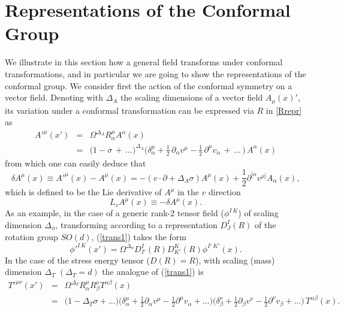 \documentclass[a4paper,11pt,openright,twoside]{book}
\let\a=\alpha   \let\b=\beta   \let\g=\gamma   \let\d=\delta
\numberwithin{equation}{section}
\begin{document}
\section{Representations of the Conformal Group}
We illustrate in this section how a general field transforms under conformal transformations, and in particular we are going to show the representations of the conformal group. 
We consider first the action of the conformal symmetry on a vector field.
Denoting with $\Delta_A$ the scaling dimensions of a vector field $A_\mu(x)'$,  its variation under a conformal transformation can be expressed via $R$ in \eqref{Rrepr} as
\begin{eqnarray}
	\label{trans1}
	A'^\mu(x')&=&\Omega^{\Delta_A} R^{\mu}_{\alpha} A^\alpha(x)\nonumber \\
	&=&\big(1-\sigma\,+\,\dots\big)^{\Delta_A}\bigg(\delta^\mu_\alpha+\frac{1}{2}\,\partial_{\alpha }v^{\mu}-\frac{1}{2}\,\partial^{\mu}v_{\alpha}\,+\,\dots\,\bigg)\,A^\alpha(x)
\end{eqnarray}
from which one can easily deduce that 
\begin{equation}
	\label{trans2}
	\delta A^\mu(x)\equiv A'^\mu(x)-A^\mu(x)=-(v\cdot \partial +\Delta_A \sigma)A^\mu(x) +\frac{1}{2} \partial^{[\alpha }v^{\mu]}A_\alpha(x), 
\end{equation}
which is defined to be the Lie derivative of $A^\mu$ in the $v$ direction
\begin{equation}
	L_v A^\mu(x) \equiv -\delta A^\mu(x).
\end{equation}
As an example, in the case of a generic rank-2 tensor field ($\phi^{I \, K}$) of scaling dimension $\Delta_\phi$, transforming according to a representation $D^I_J(R)$ of the rotation group $SO(d)$, (\ref{trans1}) takes the form 
\begin{equation}
	\phi'^{I\, K}(x')=\Omega^{\Delta_{\phi}} D^I_{I'}(R) D^K_{K'}(R) \phi^{I' \,K'}(x).
\end{equation}
In the case of the stress energy tensor ($D(R)=R$), with scaling (mass) dimension $\Delta_T$  $(\Delta_T=d)$ the analogue of (\ref{trans1}) is 
\begin{eqnarray}
	T'^{\mu\nu}(x')&=&\Omega^{\Delta_T} R^\mu_\alpha R^\nu_\beta T^{\alpha\beta}(x)\nonumber \\
	&=&\bigg(1- \Delta_T \sigma +\ldots\bigg)\bigg(\delta^\mu_\alpha+\frac{1}{2}\partial_{\alpha }v^{\mu}-\frac{1}{2}\partial^{\mu}v_{\alpha}+\ldots\bigg)
	\bigg(\delta^\nu_\beta+\frac{1}{2}\partial_{\beta }v^\nu-\frac{1}{2}\partial^{\nu }v_\beta+\ldots\bigg)\,T^{\a\b}(x).
\end{eqnarray}
\end{document}

